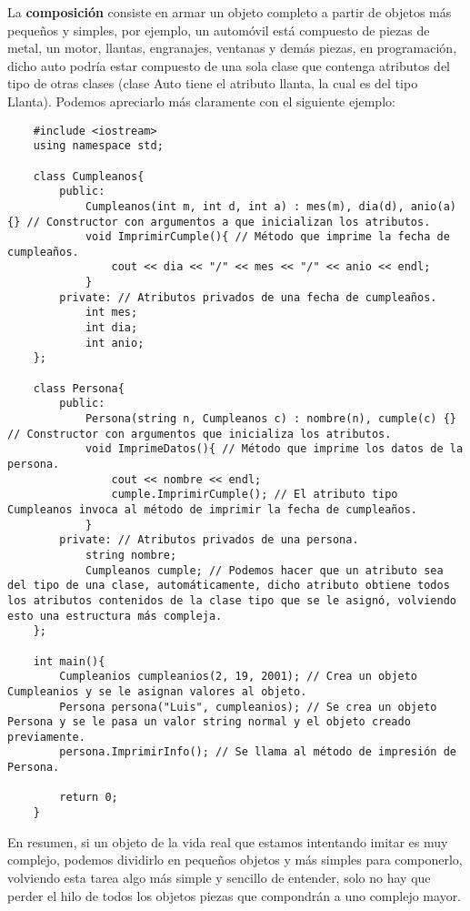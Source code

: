 La \textbf{composición} consiste en armar un objeto completo a partir de objetos más pequeños y simples, por ejemplo, un automóvil está compuesto de piezas de metal, un motor, llantas, engranajes, ventanas y demás piezas, en programación, dicho auto podría estar compuesto de una sola clase que contenga atributos del tipo de otras clases (clase Auto tiene el atributo llanta, la cual es del tipo Llanta). Podemos apreciarlo más claramente con el siguiente ejemplo:
\begin{lstlisting}
    #include <iostream>
    using namespace std;

    class Cumpleanos{
        public:
            Cumpleanos(int m, int d, int a) : mes(m), dia(d), anio(a) {} // Constructor con argumentos a que inicializan los atributos.
            void ImprimirCumple(){ // Método que imprime la fecha de cumpleaños.
                cout << dia << "/" << mes << "/" << anio << endl;
            }
        private: // Atributos privados de una fecha de cumpleaños.
            int mes;
            int dia;
            int anio;
    };
    
    class Persona{
        public:
            Persona(string n, Cumpleanos c) : nombre(n), cumple(c) {} // Constructor con argumentos que inicializa los atributos.
            void ImprimeDatos(){ // Método que imprime los datos de la persona.
                cout << nombre << endl;
                cumple.ImprimirCumple(); // El atributo tipo Cumpleanos invoca al método de imprimir la fecha de cumpleaños.
            }
        private: // Atributos privados de una persona.
            string nombre;
            Cumpleanos cumple; // Podemos hacer que un atributo sea del tipo de una clase, automáticamente, dicho atributo obtiene todos los atributos contenidos de la clase tipo que se le asignó, volviendo esto una estructura más compleja.
    };
    
    int main(){
        Cumpleanios cumpleanios(2, 19, 2001); // Crea un objeto Cumpleanios y se le asignan valores al objeto.
        Persona persona("Luis", cumpleanios); // Se crea un objeto Persona y se le pasa un valor string normal y el objeto creado previamente.
        persona.ImprimirInfo(); // Se llama al método de impresión de Persona.
    
        return 0;
    }
\end{lstlisting}

En resumen, si un objeto de la vida real que estamos intentando imitar es muy complejo, podemos dividirlo en pequeños objetos y más simples para componerlo, volviendo esta tarea algo más simple y sencillo de entender, solo no hay que perder el hilo de todos los objetos piezas que compondrán a uno complejo mayor.


